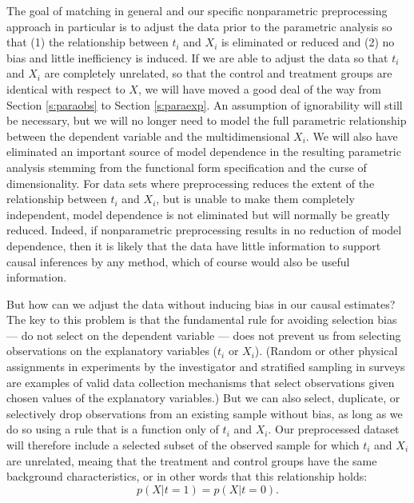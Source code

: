 \documentclass[11pt,titlepage]{article}
\begin{document}
The goal of matching in general and our specific nonparametric
preprocessing approach in particular is to adjust the data prior to
the parametric analysis so that (1) the relationship between $t_i$ and
$X_i$ is eliminated or reduced and (2) no bias and little inefficiency
is induced.  If we are able to adjust the data so that $t_i$ and $X_i$
are completely unrelated, so that the control and treatment groups are
identical with respect to $X$, we will have moved a good deal of the
way from Section \ref{s:paraobs} to Section \ref{s:paraexp}.  An
assumption of ignorability will still be necessary, but we will no
longer need to model the full parametric relationship between the
dependent variable and the multidimensional $X_i$.  We will also have
eliminated an important source of model dependence in the resulting
parametric analysis stemming from the functional form specification
and the curse of dimensionality.  For data sets where preprocessing
reduces the extent of the relationship between $t_i$ and $X_i$, but is
unable to make them completely independent, model dependence is not
eliminated but will normally be greatly reduced.  Indeed, if
nonparametric preprocessing results in no reduction of model
dependence, then it is likely that the data have little information to
support causal inferences by any method, which of course would also be
useful information.

But how can we adjust the data without inducing bias in our causal
estimates?  The key to this problem is that the fundamental rule for
avoiding selection bias --- do not select on the dependent variable
--- does not prevent us from selecting observations on the explanatory
variables ($t_i$ or $X_i$).  (Random or other physical assignments in
experiments by the investigator and stratified sampling in surveys are
examples of valid data collection mechanisms that select observations
given chosen values of the explanatory variables.)  But we can also
select, duplicate, or selectively drop observations from an existing
sample without bias, as long as we do so using a rule that is a
function only of $t_i$ and $X_i$.  Our preprocessed dataset will
therefore include a selected subset of the observed sample for which
$t_i$ and $X_i$ are unrelated, meaing that the treatment and control
groups have the same background characteristics, or in other words
that this relationship holds:
\begin{equation}
  \label{balance}
  p(X|t=1) = p(X|t=0).
\end{equation}
\end{document}
